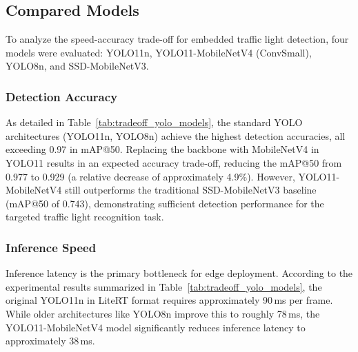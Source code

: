 

\subsection{Compared Models}
To analyze the speed-accuracy trade-off for embedded traffic light detection, four models were evaluated: YOLO11n, YOLO11-MobileNetV4 (ConvSmall), YOLO8n, and SSD-MobileNetV3.

\subsubsection{Detection Accuracy} 

As detailed in Table~\ref{tab:tradeoff_yolo_models}, the standard YOLO architectures (YOLO11n, YOLO8n) achieve the highest detection accuracies, all exceeding 0.97 in mAP@50. Replacing the backbone with MobileNetV4 in YOLO11 results in an expected accuracy trade-off, reducing the mAP@50 from 0.977 to 0.929 (a relative decrease of approximately 4.9\%). However, YOLO11-MobileNetV4 still outperforms the traditional SSD-MobileNetV3 baseline (mAP@50 of 0.743), demonstrating sufficient detection performance for the targeted traffic light recognition task.

\subsubsection{Inference Speed}

Inference latency is the primary bottleneck for edge deployment. According to the experimental results summarized in Table~\ref{tab:tradeoff_yolo_models}, the original YOLO11n in LiteRT format requires approximately 90\,ms per frame. While older architectures like YOLO8n improve this to roughly 78\,ms, the YOLO11-MobileNetV4 model significantly reduces inference latency to approximately 38\,ms. 


